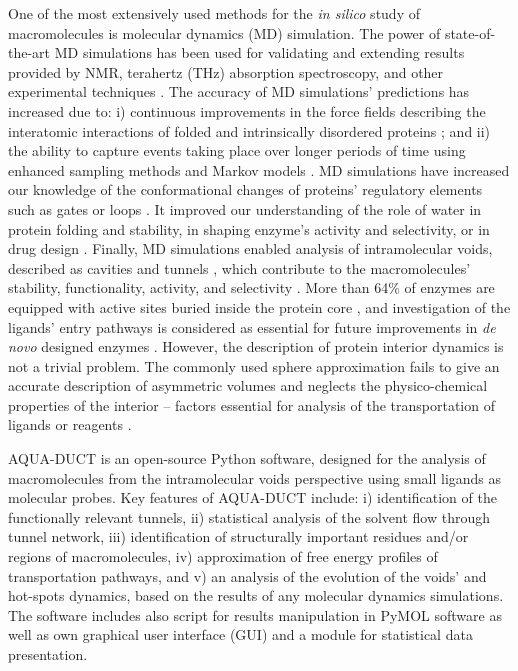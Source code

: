 \documentclass[9pt,tutorial]{livecoms}
\begin{document}
One of the most extensively used methods for the \textit{in silico} study of macromolecules is  molecular dynamics (MD) simulation. The power of state-of-the-art MD simulations has been used for validating and extending results provided by NMR, terahertz (THz) absorption spectroscopy, and other experimental techniques \cite{Bottaro2018}. The accuracy of MD simulations’ predictions has increased due to:  i) continuous improvements in the force fields describing the interatomic interactions of folded and intrinsically disordered proteins \cite{Huang2017}; and ii) the ability to capture events taking place over longer periods of time using enhanced sampling methods \cite{Bernardi2015} and Markov models \cite{Husic2018}. MD simulations have increased our knowledge of the conformational changes of proteins’ regulatory elements such as gates \cite{Gora2013} or loops \cite{Kress2018}. It improved our understanding of the role of water in protein folding and stability, in shaping enzyme’s activity and selectivity, or in drug design \cite{Mondal2017,Spyrakis2017}. Finally, MD simulations enabled analysis of intramolecular voids, described as cavities \cite{Stank2016} and tunnels \cite{Kingsley2015,Marques2016}, which contribute to the macromolecules’ stability, functionality, activity, and selectivity \cite{Kokkonen2019}. More than 64\% of enzymes are equipped with active sites buried inside the protein core \cite{Pravda2014}, and investigation of the ligands’ entry pathways is considered as essential for future improvements in \textit{de novo} designed enzymes \cite{Huang2016}. However, the description of protein interior dynamics is not a trivial problem. The commonly used sphere approximation fails to give an accurate description of asymmetric volumes and neglects the physico-chemical properties of the interior – factors essential for analysis of the transportation of ligands or reagents \cite{Kaushik2018}.

AQUA-DUCT is an open-source Python software, designed for the analysis of macromolecules from the intramolecular voids perspective using small ligands as molecular probes. Key features of AQUA-DUCT include: i) identification of the functionally relevant tunnels, ii) statistical analysis of the solvent flow through tunnel network, iii) identification of structurally important residues and/or regions of macromolecules, iv) approximation of free energy profiles of transportation pathways, and v) an analysis of the evolution of the voids’ and hot-spots dynamics, based on the results of any molecular dynamics simulations. The software includes also script for results manipulation in PyMOL \cite{Delano2002} software as well as own graphical user interface (GUI) and a module for statistical data presentation. 
\end{document}
